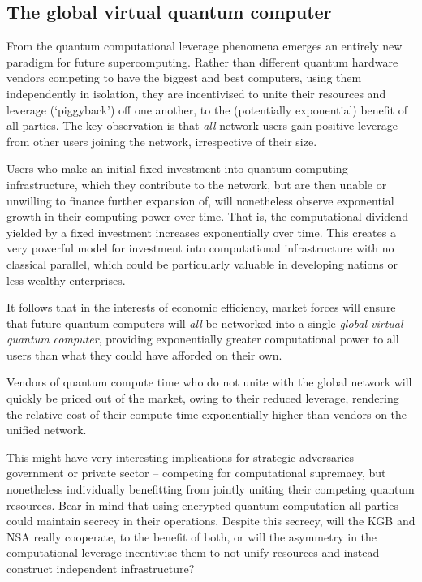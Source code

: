 \subsection{The global virtual quantum computer} \label{sec:GVQC} 

From the quantum computational leverage phenomena emerges an entirely new paradigm for future supercomputing. Rather than different quantum hardware vendors competing to have the biggest and best computers, using them independently in isolation, they are incentivised to unite their resources and leverage (`piggyback') off one another, to the (potentially exponential) benefit of all parties. The key observation is that \textit{all} network users gain positive leverage from other users joining the network, irrespective of their size.

Users who make an initial fixed investment into quantum computing infrastructure, which they contribute to the network, but are then unable or unwilling to finance further expansion of, will nonetheless observe exponential growth in their computing power over time. That is, the computational dividend yielded by a fixed investment increases exponentially over time. This creates a very powerful model for investment into computational infrastructure with no classical parallel, which could be particularly valuable in developing nations or less-wealthy enterprises.

It follows that in the interests of economic efficiency, market forces will ensure that future quantum computers will \textit{all} be networked into a single \textit{global virtual quantum computer}, providing exponentially greater computational power to all users than what they could have afforded on their own.

Vendors of quantum compute time who do not unite with the global network will quickly be priced out of the market, owing to their reduced leverage, rendering the relative cost of their compute time exponentially  higher than vendors on the unified network.

This might have very interesting implications for strategic adversaries -- government or private sector -- competing for computational supremacy, but nonetheless individually benefitting from jointly uniting their competing quantum resources. Bear in mind that using encrypted quantum computation all parties could maintain secrecy in their operations. Despite this secrecy, will the KGB and NSA really cooperate, to the benefit of both, or will the asymmetry in the computational leverage incentivise them to not unify resources and instead construct independent infrastructure?

